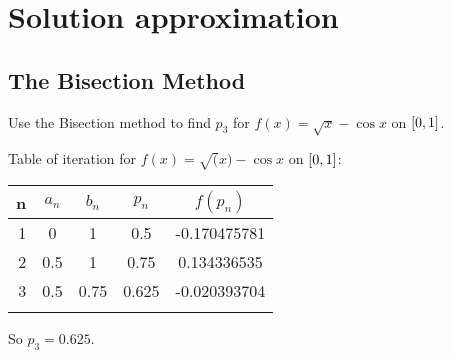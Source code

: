 \documentclass[../../Assignments.tex]{subfiles}
\begin{document}
\chapter{Solution approximation}

\section{The Bisection Method}

\begin{exercise}
    Use the Bisection method to find \(p_3\) for \(f(x) = \sqrt{x} - \cos x\) on \(\interval{0}{1}\).
\end{exercise}

\begin{solution}
    Table of iteration for \(f(x) = \sqrt(x) - \cos x\) on \(\interval{0}{1}\):

    \begin{tabular}{r S[table-format=1.1] S[table-format=1.2] S[table-format=1.3] S[table-format=-1.9]}
        \\
        \toprule
        n   &  {\(a_n\)}  &  {\(b_n\)}  &  {\(p_n\)}  &  {\(f(p_n)\)} \\
           &  0          &  1          &  0.5        &  -0.170475781 \\
        2   &  0.5        &  1          &  0.75       &   0.134336535 \\
        3   &  0.5        &  0.75       &  0.625      &  -0.020393704 \\
        \bottomrule
        \\
    \end{tabular}

    So \(p_3 = \num{0.625}\).
\end{solution}
\end{document}
